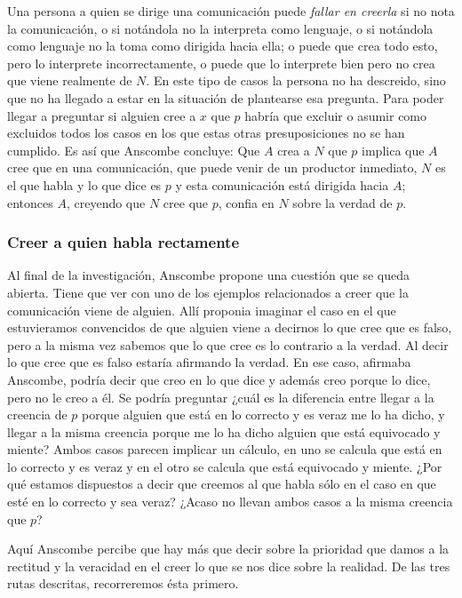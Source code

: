 Una persona a quien se dirige una comunicación puede \emph{fallar en creerla} si no nota la comunicación, o si notándola no la interpreta como lenguaje, o si notándola como lenguaje no la toma como dirigida hacia ella; o puede que crea todo esto, pero lo interprete incorrectamente, o puede que lo interprete bien pero no crea que viene realmente de $N$. En este tipo de casos la persona no ha descreido, sino que no ha llegado a estar en la situación de plantearse esa pregunta. Para poder llegar a preguntar si alguien cree a $x$ que $p$ habría que excluir o asumir como excluidos todos los casos en los que estas otras presuposiciones no se han cumplido. Es así que Anscombe concluye:  Que $A$ crea a $N$ que $p$ implica que $A$ cree que en una comunicación, que puede venir de un productor inmediato, $N$ es el que habla y lo que dice es $p$ y esta comunicación está dirigida hacia $A$; entonces $A$, creyendo que $N$ cree que $p$, confia en $N$ sobre la verdad de $p$.

\subsubsection{Creer a quien habla rectamente}
Al final de la investigación, Anscombe propone una cuestión que se queda
abierta. Tiene que ver con uno de los ejemplos relacionados a creer que la
comunicación viene de alguien. Allí proponia imaginar el caso en el que
estuvieramos convencidos de que alguien viene a decirnos lo que cree que es
falso, pero a la misma vez sabemos que lo que cree es lo contrario a la verdad.
Al decir lo que cree que es falso estaría afirmando la verdad. En ese caso,
afirmaba Anscombe, podría decir que creo en lo que dice y además creo porque lo
dice, pero no le creo a él. Se podría preguntar ¿cuál es la diferencia entre
llegar a la creencia de $p$ porque alguien que está en lo correcto y es veraz me
lo ha dicho, y llegar a la misma creencia porque me lo ha dicho alguien que está
equivocado y miente? Ambos casos parecen implicar un cálculo, en uno se calcula
que está en lo correcto y es veraz y en el otro se calcula que está equivocado y
miente. ¿Por qué estamos dispuestos a decir que creemos al que habla sólo en el
caso en que esté en lo correcto y sea veraz? ¿Acaso no llevan ambos casos a la
misma creencia que $p$?

Aquí Anscombe percibe que hay más que decir sobre la prioridad que damos a la
rectitud y la veracidad en el creer lo que se nos dice sobre la realidad. De las
tres rutas descritas, recorreremos ésta primero.
